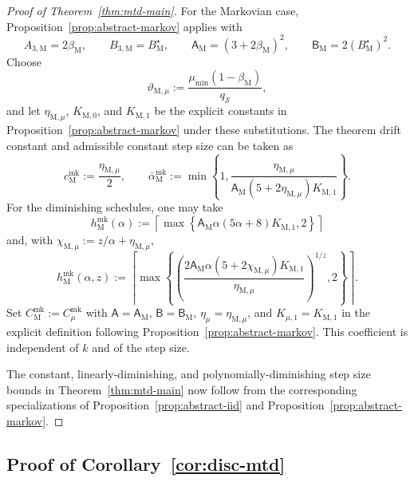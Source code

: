 \documentclass{article}
\newcommand{\X}{\mathcal{S}}
\begin{document}
\begin{proof}[Proof of Theorem~\ref{thm:mtd-main}]
For the Markovian case, Proposition~\ref{prop:abstract-markov} applies with
\begin{equation}
A_{3,\mathrm M}=2\beta_{\mathrm M},\qquad B_{3,\mathrm M}=B_{\mathrm M}^\star,\qquad \mathsf A_{\mathrm M}=(3+2\beta_{\mathrm M})^2,\qquad \mathsf B_{\mathrm M}=2(B_{\mathrm M}^\star)^2.
\end{equation}
Choose
\begin{equation}
\vartheta_{\mathrm M,\mu}:=\frac{\mu_{\min}(1-\beta_{\mathrm M})}{q_{\X}},
\end{equation}
and let $\eta_{\mathrm M,\mu}$, $K_{\mathrm M,0}$, and $K_{\mathrm M,1}$ be the explicit constants in Proposition~\ref{prop:abstract-markov} under these substitutions. The theorem drift constant and admissible constant step size can be taken as
\begin{equation}
c_{\mathrm M}^{\mathrm{mk}}:=\frac{\eta_{\mathrm M,\mu}}{2},\qquad \bar\alpha_{\mathrm M}^{\mathrm{mk}}:=\min\left\{1,\frac{\eta_{\mathrm M,\mu}}{\mathsf A_{\mathrm M}(5+2\eta_{\mathrm M,\mu})K_{\mathrm M,1}}\right\}.
\end{equation}
For the diminishing schedules, one may take
\begin{equation}
h_{\mathrm M}^{\mathrm{mk}}(\alpha):=\left\lceil\max\left\{\mathsf A_{\mathrm M}\alpha(5\alpha+8)K_{\mathrm M,1},2\right\}\right\rceil
\end{equation}
and, with $\chi_{\mathrm M,\mu}:=z/\alpha+\eta_{\mathrm M,\mu}$,
\begin{equation}
h_{\mathrm M}^{\mathrm{mk}}(\alpha,z):=\left\lceil\max\left\{\left(\frac{2\mathsf A_{\mathrm M}\alpha(5+2\chi_{\mathrm M,\mu})K_{\mathrm M,1}}{\eta_{\mathrm M,\mu}}\right)^{1/z},2\right\}\right\rceil.
\end{equation}
Set $C_{\mathrm M}^{\mathrm{mk}}:=C_\mu^{\mathrm{mk}}$ with $\mathsf A=\mathsf A_{\mathrm M}$, $\mathsf B=\mathsf B_{\mathrm M}$, $\eta_\mu=\eta_{\mathrm M,\mu}$, and $K_{\mu,1}=K_{\mathrm M,1}$ in the explicit definition following Proposition~\ref{prop:abstract-markov}. This coefficient is independent of $k$ and of the step size.

The constant, linearly-diminishing, and polynomially-diminishing step size bounds in Theorem~\ref{thm:mtd-main} now follow from the corresponding specializations of Proposition~\ref{prop:abstract-iid} and Proposition~\ref{prop:abstract-markov}.
\end{proof}

\subsection{Proof of Corollary~\ref{cor:disc-mtd}}
\end{document}
